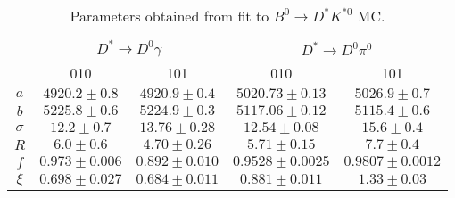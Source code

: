 \begin{table}
  \centering
  \begin{tabular}{ccccc}
      \toprule
      & \multicolumn{2}{c}{$D^* \to D^0\gamma$} & \multicolumn{2}{c}{$D^* \to D^0\pi^0$} \\
      & 010 & 101 & 010 & 101 \\
      \midrule
$a$ & $4920.2 \pm 0.8$ & $4920.9 \pm 0.4$ & $5020.73 \pm 0.13$ & $5026.9 \pm 0.7$ \\
$b$ & $5225.8 \pm 0.6$ & $5224.9 \pm 0.3$ & $5117.06 \pm 0.12$ & $5115.4 \pm 0.6$ \\
$\sigma$ & $12.2 \pm 0.7$ & $13.76 \pm 0.28$ & $12.54 \pm 0.08$ & $15.6 \pm 0.4$ \\
$R$ & $6.0 \pm 0.6$ & $4.70 \pm 0.26$ & $5.71 \pm 0.15$ & $7.7 \pm 0.4$ \\
$f$ & $0.973 \pm 0.006$ & $0.892 \pm 0.010$ & $0.9528 \pm 0.0025$ & $0.9807 \pm 0.0012$ \\
$\xi$ & $0.698 \pm 0.027$ & $0.684 \pm 0.011$ & $0.881 \pm 0.011$ & $1.33 \pm 0.03$ \\
      \bottomrule
  \end{tabular}
  \caption{Parameters obtained from fit to $B^0 \to D^*K^{*0}$ MC.}
\label{tab:part_reco_parameters}
\end{table}
